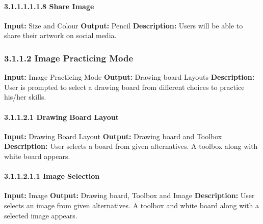 \documentclass{scrreprt}
\begin{document}
\paragraph{3.1.1.1.1.1.8 Share Image}
\hfill \vspace{2.5mm} \break 
\textbf{Input:} Size and Colour \newline
\textbf{Output:} Pencil
\vspace{1mm}\newline
\textbf{Description:} \newline 
Users will be able to share their artwork on social media.

\subsubsection{3.1.1.2 Image Practicing Mode}
\textbf{Input:} Image Practicing Mode \newline
\textbf{Output:} Drawing board Layouts
\vspace{1mm}\newline
\textbf{Description:} \newline 
User is prompted to select a drawing board from different choices to practice his/her skills.

\paragraph{3.1.1.2.1 Drawing Board Layout}
\hfill \vspace{2.5mm} \break 
\textbf{Input:} Drawing Board Layout \newline
\textbf{Output:} Drawing board and Toolbox
\vspace{1mm}\newline
\textbf{Description:} \newline 
User selects a board from given alternatives. A toolbox along with white board appears.

\paragraph{3.1.1.2.1.1 Image Selection}
\hfill \vspace{2.5mm} \break 
\textbf{Input:} Image \newline
\textbf{Output:}  Drawing board, Toolbox and Image
\vspace{1mm}\newline
\textbf{Description:} \newline 
User selects an image from given alternatives. A toolbox and white board along with a selected image appears.
\end{document}
